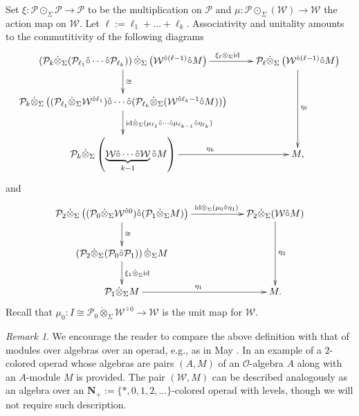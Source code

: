 \documentclass[11pt]{amsart}
\theoremstyle{definition}
\theoremstyle{remark}
\newtheorem{remark}[subsection]{Remark}
\newcommand{\id}{\mathrm{id}}
\newcommand{\pt}{*}
\newcommand{\Cal}[1]{\mathcal{#1}}
\newcommand{\circhat}{\hat{\circ}}
\newcommand{\circdot}{{\odot}}
\newcommand{\tensordot}{\dot{\otimes}}
\begin{document}
    Set $\xi\colon \Cal{P}\circdot_{\Sigma} \Cal{P}\to \Cal{P}$ to be the multiplication on $\Cal{P}$ and $\mu\colon \Cal{P}\circdot_{\Sigma} (\Cal{W})\to \Cal{W}$ the action map on $\Cal{W}$. Let $\ell:=\ell_1+\dots+\ell_k$. Associativity and unitality amounts to the commutitivity of the following diagrams \begin{equation} \label{assoc-A-infty-alg}
        \xymatrix{
            \left(\Cal{P}_{k}\tensordot_{\Sigma}  (\Cal{P}_{\ell_1}\circhat \cdots \circhat \Cal{P}_{\ell_k})\right) \tensordot_{\Sigma}  \left( \Cal{W}^{\circhat (\ell-1)} \circhat M\right) \ar[r]^<(.2){\xi_{\ell}\otimes_{\Sigma}\id} \ar[d]^{\cong}
            &
            \Cal{P}_{\ell} \tensordot_{\Sigma}  \left( \Cal{W}^{\circhat (\ell-1)} \circhat M\right) \ar[dd]^{\eta_{\ell}}
            \\
            \Cal{P}_{k}\tensordot_{\Sigma}  \left( (\Cal{P}_{\ell_1}\tensordot_{\Sigma}  \Cal{W}^{\circhat \ell_1} ) \circhat \cdots\circhat (\Cal{P}_{\ell_k} \tensordot_{\Sigma}  ( \Cal{W}^{\circhat \ell_k-1}\circhat M ) ) \right) 
            \ar[d]^<(.3){\id\tensordot_{\Sigma} (\mu_{\ell_1} \circhat \cdots \circhat \mu_{\ell_{k-1}}\circhat \eta_{\ell_k})}
            &
            \\
            \Cal{P}_k \tensordot_{\Sigma}  \left( \underbrace{\Cal{W}\circhat \cdots \circhat \Cal{W}}_{k-1} \circhat M \right) \ar[r]^{\eta_k}
            &
        M,
        }
    \end{equation} and
    \begin{equation} \label{unit-A-infty-alg}
        \xymatrix{
            \Cal{P}_2 \tensordot_{\Sigma}  \left( (\Cal{P}_0\tensordot_{\Sigma}  \Cal{W}^{\circhat 0}) \circhat (\Cal{P}_1\tensordot_{\Sigma}  M) \right) \ar[rr]^<(.3){\id\tensordot_{\Sigma} (\mu_0 \circhat \eta_1)} \ar[d]^{\cong}
            &&
            \Cal{P}_2\tensordot_{\Sigma}  (\Cal{W} \circhat M) \ar[dd]^{\eta_2}
            \\
            \left( \Cal{P}_2 \tensordot_{\Sigma}  (\Cal{P}_0\circhat \Cal{P}_1) \right) \tensordot_{\Sigma}  M \ar[d]^{\xi_1\tensordot_{\Sigma} \id}
            &&
            \\
            \Cal{P}_1 \tensordot_{\Sigma}  M \ar[rr]^{\eta_1}
            &&
            M.}
    \end{equation} Recall that $\mu_0\colon I\cong \Cal{P}_0\tensordot_{\Sigma}  \Cal{W}^{\circhat 0}\to \Cal{W}$ is the unit map for $\Cal{W}$.

\begin{remark}
    We encourage the reader to compare the above definition with that of modules over algebras over an operad, e.g.,  as in May \cite[Definition 3]{May}. In \cite[1.5.1]{BM-trees} an example of a $2$-colored operad whose algebras are pairs $(A,M)$ of an $\Cal{O}$-algebra $A$ along with an $A$-module $M$ is provided. The pair $(\Cal{W}, M)$ can be described analogously as an algebra over an $\mathbf{N}_+:=\{\pt, 0,1,2,\dots\}$-colored operad with levels, though we will not require such description.  
\end{remark}
\end{document}

